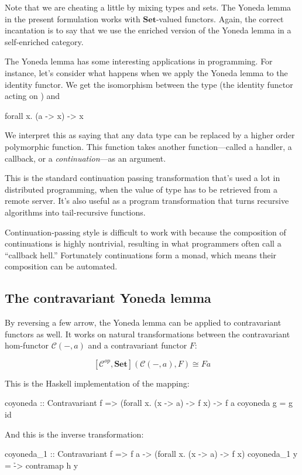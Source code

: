 \documentclass[DaoFP]{subfiles}
\begin{document}
Note that we are cheating a little by mixing types and sets. The Yoneda lemma in the present formulation works with  $\mathbf{Set}$-valued functors. Again, the correct incantation is to say that we use the enriched version of the Yoneda lemma in a self-enriched category.

The Yoneda lemma has some interesting applications in programming. For instance, let's consider what happens when we apply the Yoneda lemma to the identity functor. We get the isomorphism between the type  (the identity functor acting on ) and
\begin{haskell}
forall x. (a -> x) -> x
\end{haskell}
We interpret this as saying that any data type  can be replaced by a higher order polymorphic function. This function takes another function---called a handler, a callback, or a \emph{continuation}---as an argument. 

This is the standard continuation passing transformation that's used a lot in distributed programming, when the value of type  has to be retrieved from a remote server. It's also useful as a program transformation that turns recursive algorithms into tail-recursive functions.

Continuation-passing style is difficult to work with because the composition of continuations is highly nontrivial, resulting in what programmers often call a ``callback hell.'' Fortunately continuations form a monad, which means their composition can be automated.

\subsection{The contravariant Yoneda lemma}

By reversing a few arrow, the Yoneda lemma can be applied to contravariant functors as well. It works on natural transformations between the contravariant hom-functor $\mathcal{C}(-, a)$ and a contravariant functor $F$:

\[ [\mathcal{C}^{op}, \mathbf{Set}]( \mathcal{C}(-, a), F) \cong F a \]

This is the Haskell implementation of the mapping:
\begin{haskell}
coyoneda :: Contravariant f => (forall x. (x -> a) -> f x) -> f a
coyoneda g = g id
\end{haskell}
And this is the inverse transformation:
\begin{haskell}
coyoneda_1 :: Contravariant f => f a -> (forall x. (x -> a) -> f x)
coyoneda_1 y = \h -> contramap h y
\end{haskell}
\end{document}
